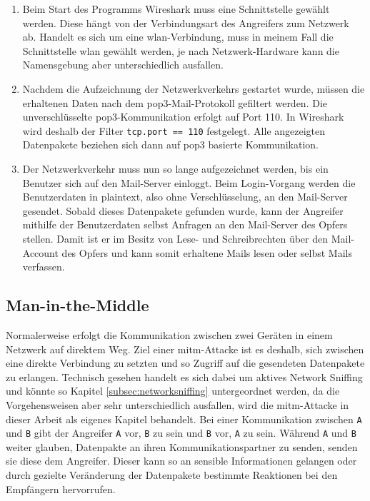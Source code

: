 \documentclass[11pt, a4paper]{article}
\begin{document}
\begin{enumerate}
	\item Beim Start des Programms Wireshark muss eine Schnittstelle gewählt werden. Diese hängt von der Verbindungsart des Angreifers zum Netzwerk ab. Handelt es sich um eine \gls{wlan}-Verbindung, muss in meinem Fall die Schnittstelle \gls{wlan} gewählt werden, je nach Netzwerk-Hardware kann die Namensgebung aber unterschiedlich ausfallen.
	\item Nachdem die Aufzeichnung der Netzwerkverkehrs gestartet wurde, müssen die erhaltenen Daten nach dem \gls{pop3}-Mail-Protokoll gefiltert werden. Die unverschlüsselte \gls{pop3}-Kommunikation erfolgt auf Port 110. In Wireshark wird deshalb der Filter \texttt{tcp.port == 110} festgelegt. Alle angezeigten Datenpakete beziehen sich dann auf \gls{pop3} basierte Kommunikation.
	\item Der Netzwerkverkehr muss nun so lange aufgezeichnet werden, bis ein Benutzer sich auf den Mail-Server einloggt. Beim Login-Vorgang werden die Benutzerdaten in plaintext, also ohne Verschlüsselung, an den Mail-Server gesendet. Sobald dieses Datenpakete gefunden wurde, kann der Angreifer mithilfe der Benutzerdaten selbst Anfragen an den Mail-Server des Opfers stellen. Damit ist er im Besitz von Lese- und Schreibrechten über den Mail-Account des Opfers und kann somit erhaltene Mails lesen oder selbst Mails verfassen.
\end{enumerate}

\subsection{Man-in-the-Middle}
Normalerweise erfolgt die Kommunikation zwischen zwei Geräten in einem Netzwerk auf direktem Weg. Ziel einer \gls{mitm}-Attacke ist es deshalb, sich zwischen eine direkte Verbindung zu setzten und so Zugriff auf die gesendeten Datenpakete zu erlangen. Technisch gesehen handelt es sich dabei um aktives Network Sniffing und könnte so Kapitel \ref{subsec:networksniffing} untergeordnet werden, da die Vorgehensweisen aber sehr unterschiedlich ausfallen, wird die \gls{mitm}-Attacke in dieser Arbeit als eigenes Kapitel behandelt. Bei einer Kommunikation zwischen \texttt{A} und \texttt{B} gibt der Angreifer \texttt{A} vor, \texttt{B} zu sein und \texttt{B} vor, \texttt{A} zu sein. Während \texttt{A} und \texttt{B} weiter glauben, Datenpakte an ihren Kommunikationspartner zu senden, senden sie diese dem Angreifer. Dieser kann so an sensible Informationen gelangen oder durch gezielte Veränderung der Datenpakete bestimmte Reaktionen bei den Empfängern hervorrufen.
\end{document}

